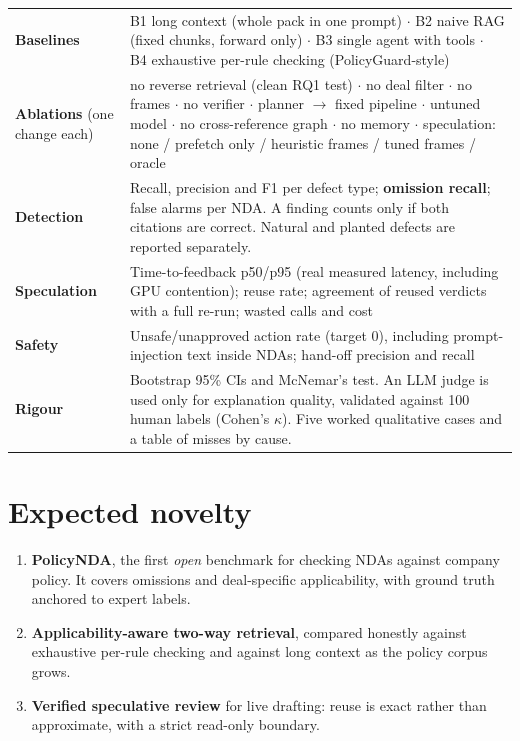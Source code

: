 \documentclass[11pt,a4paper]{article}
\begin{document}
\begin{table}[H]\small
\begin{tabularx}{\textwidth}{@{}>{\raggedright\arraybackslash}p{2.3cm}L@{}}
\toprule
\textbf{Baselines} & B1 long context (whole pack in one prompt) $\cdot$ B2 naive RAG (fixed chunks, forward only) $\cdot$ B3 single agent with tools $\cdot$ B4 exhaustive per-rule checking (PolicyGuard-style) \\
\textbf{Ablations} (one change each) & no reverse retrieval (clean RQ1 test) $\cdot$ no deal filter $\cdot$ no frames $\cdot$ no verifier $\cdot$ planner $\rightarrow$ fixed pipeline $\cdot$ untuned model $\cdot$ no cross-reference graph $\cdot$ no memory $\cdot$ speculation: none / prefetch only / heuristic frames / tuned frames / oracle \\
\textbf{Detection} & Recall, precision and F1 per defect type; \textbf{omission recall}; false alarms per NDA. A finding counts only if both citations are correct. Natural and planted defects are reported separately. \\
\textbf{Speculation} & Time-to-feedback p50/p95 (real measured latency, including GPU contention); reuse rate; agreement of reused verdicts with a full re-run; wasted calls and cost \\
\textbf{Safety} & Unsafe/unapproved action rate (target 0), including prompt-injection text inside NDAs; hand-off precision and recall \\
\textbf{Rigour} & Bootstrap 95\% CIs and McNemar's test. An LLM judge is used only for explanation quality, validated against 100 human labels (Cohen's $\kappa$). Five worked qualitative cases and a table of misses by cause. \\
\bottomrule
\end{tabularx}
\end{table}

\section{Expected novelty}
\begin{enumerate}
\item \textbf{PolicyNDA}, the first \emph{open} benchmark for checking NDAs against company policy. It covers omissions and deal-specific applicability, with ground truth anchored to expert labels.
\item \textbf{Applicability-aware two-way retrieval}, compared honestly against exhaustive per-rule checking and against long context as the policy corpus grows.
\item \textbf{Verified speculative review} for live drafting: reuse is exact rather than approximate, with a strict read-only boundary.
\end{enumerate}
\end{document}
